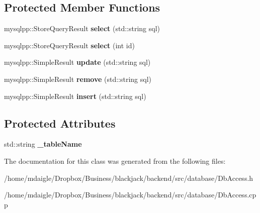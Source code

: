 \subsection*{\-Protected \-Member \-Functions}
\begin{DoxyCompactItemize}
\item 
\hypertarget{classDbAccess_a2688e89342a14b016091f0abcbbfa895}{
mysqlpp\-::\-Store\-Query\-Result {\bfseries select} (std\-::string sql)}
\label{d4/dda/classDbAccess_a2688e89342a14b016091f0abcbbfa895}

\item 
\hypertarget{classDbAccess_ac3b957af4b56e4d9b2f191ba0a04a3ce}{
mysqlpp\-::\-Store\-Query\-Result {\bfseries select} (int id)}
\label{d4/dda/classDbAccess_ac3b957af4b56e4d9b2f191ba0a04a3ce}

\item 
\hypertarget{classDbAccess_afcc558d24b1503febb0fad72e50ab05e}{
mysqlpp\-::\-Simple\-Result {\bfseries update} (std\-::string sql)}
\label{d4/dda/classDbAccess_afcc558d24b1503febb0fad72e50ab05e}

\item 
\hypertarget{classDbAccess_ab39c9c3013a8fa694ed912280abfc48b}{
mysqlpp\-::\-Simple\-Result {\bfseries remove} (std\-::string sql)}
\label{d4/dda/classDbAccess_ab39c9c3013a8fa694ed912280abfc48b}

\item 
\hypertarget{classDbAccess_afa543877ce4ba63c6c80e27c2edd388f}{
mysqlpp\-::\-Simple\-Result {\bfseries insert} (std\-::string sql)}
\label{d4/dda/classDbAccess_afa543877ce4ba63c6c80e27c2edd388f}

\end{DoxyCompactItemize}
\subsection*{\-Protected \-Attributes}
\begin{DoxyCompactItemize}
\item 
\hypertarget{classDbAccess_a2338af02e8b05db6da74164252b7deae}{
std\-::string {\bfseries \-\_\-table\-Name}}
\label{d4/dda/classDbAccess_a2338af02e8b05db6da74164252b7deae}

\end{DoxyCompactItemize}


\-The documentation for this class was generated from the following files\-:\begin{DoxyCompactItemize}
\item 
/home/mdaigle/\-Dropbox/\-Business/blackjack/backend/src/database/\-Db\-Access.\-h\item 
/home/mdaigle/\-Dropbox/\-Business/blackjack/backend/src/database/\-Db\-Access.\-cpp\end{DoxyCompactItemize}
